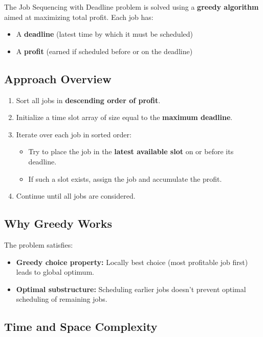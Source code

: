 \documentclass[14pt]{extarticle}
\begin{document}
The Job Sequencing with Deadline problem is solved using a \textbf{greedy algorithm} aimed at maximizing total profit. Each job has:
\begin{itemize}
    \item A \textbf{deadline} (latest time by which it must be scheduled)
    \item A \textbf{profit} (earned if scheduled before or on the deadline)
\end{itemize}

\subsection*{Approach Overview}

\begin{enumerate}
    \item Sort all jobs in \textbf{descending order of profit}.
    \item Initialize a time slot array of size equal to the \textbf{maximum deadline}.
    \item Iterate over each job in sorted order:
    \begin{itemize}
        \item Try to place the job in the \textbf{latest available slot} on or before its deadline.
        \item If such a slot exists, assign the job and accumulate the profit.
    \end{itemize}
    \item Continue until all jobs are considered.
\end{enumerate}

\subsection*{Why Greedy Works}

The problem satisfies:
\begin{itemize}
    \item \textbf{Greedy choice property:} Locally best choice (most profitable job first) leads to global optimum.
    \item \textbf{Optimal substructure:} Scheduling earlier jobs doesn't prevent optimal scheduling of remaining jobs.
\end{itemize}

\subsection*{Time and Space Complexity}
\end{document}
